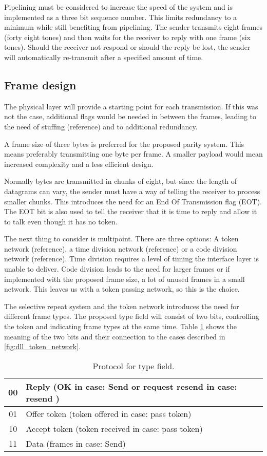 Pipelining \cite[323]{KOM} must be considered to increase the speed of the
system and is implemented as a three bit sequence number. This limits redundancy to a minimum
while still benefiting from pipelining. The sender transmits eight frames
(forty eight tones) and then waits for the receiver to reply with one frame
(six tones). Should the receiver not respond or should the reply be lost, the
sender will automatically re-transmit after a specified amount of time.

\subsection{Frame design}\label{dll_frame_design}
The physical layer will provide a starting point for each
transmission. If this was not the case,
additional flags would be needed in between the frames, leading to the
need of stuffing (reference) and to additional redundancy.

A frame size of three bytes is preferred for the proposed parity system. This
means preferably transmitting one byte per frame. A smaller payload would mean
increased complexity and a less efficient design.

Normally bytes are transmitted in chunks of eight, but since the length of
datagrams can vary, the sender must have a way of telling the receiver to process smaller
chunks. This introduces the need for an End Of Transmission flag (EOT). The EOT
bit is also used to tell the receiver that it is time to reply and allow it to
talk even though it has no token.

The next thing to consider is multipoint. There are three options: A token
network (reference), a time division network (reference) or a code division
network (reference). Time division requires a level of timing the interface layer
is unable to deliver. Code division leads to the need for larger frames or if implemented with the
proposed frame size, a lot of unused frames in a small network. This leaves us
with a token passing network, so this is the choice.

The selective repeat system and the token network introduces the need for
different frame types. The proposed type field will consist of two bits,
controlling the token and indicating frame types at the same time. Table
\ref{tab:protocol_for_type_field} shows the meaning of the two bits and their
connection to the cases described in \ref{fig:dll_token_network}.

\begin{table}[htb]
	\centering
	\begin{tabular}{|c|l|}
		\hline
		00 &  Reply (OK in case: Send or request resend in case: resend
		)
		\\
		\hline
		01 &  Offer token (token offered in case: pass token) \\
		\hline
		10 &  Accept token (token received in case: pass token) \\
		\hline
		11 &  Data (frames in case: Send)\\
		\hline
	\end{tabular}
	\caption{Protocol for type field.}
	\label{tab:protocol_for_type_field}
\end{table}

